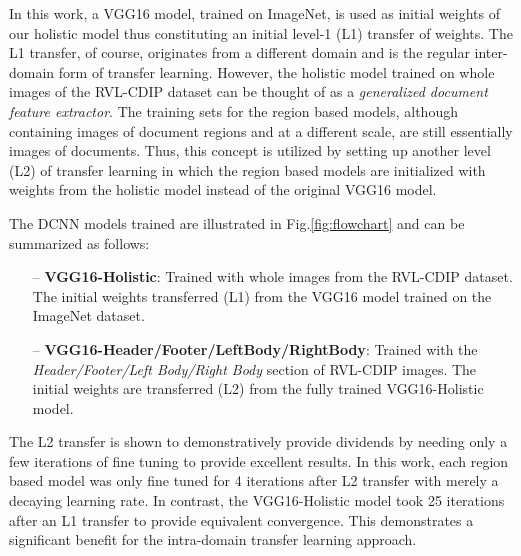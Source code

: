 \documentclass[10pt,conference,a4paper]{IEEEtran}
\begin{document}
In this work, a VGG16 model, trained on ImageNet, is used as initial weights of our holistic model thus constituting an initial level-1 (L1) transfer of weights. The L1 transfer, of course, originates from a different domain and is the regular inter-domain form of transfer learning. However, the holistic model trained on whole images of the RVL-CDIP dataset can be thought of as a \textit{generalized document feature extractor}. The training sets for the region based models, although containing images of document regions and at a different scale, are still essentially images of documents. Thus, this concept is utilized by setting up another level (L2) of transfer learning in which the region based models are initialized with weights from the holistic model instead of the original VGG16 model.

The DCNN models trained are illustrated in Fig.\ref{fig:flowchart} and can be summarized as follows:

\begin{itemize}
\item[--] \textbf{VGG16-Holistic}: Trained with whole images from the RVL-CDIP dataset. The initial weights transferred (L1) from the VGG16 model trained on the ImageNet dataset.
 	
\item[--] \textbf{VGG16-Header/Footer/LeftBody/RightBody}: Trained with the \textit{Header/Footer/Left Body/Right Body} section of RVL-CDIP images. The initial weights are transferred (L2) from the fully trained VGG16-Holistic model.
\end{itemize}

The L2 transfer is shown to demonstratively provide dividends by needing only a few iterations of fine tuning to provide excellent results. In this work, each region based model was only fine tuned for 4 iterations after L2 transfer with merely a decaying learning rate. In contrast, the VGG16-Holistic model took 25 iterations after an L1 transfer to provide equivalent convergence. This demonstrates a significant benefit for the intra-domain transfer learning approach.
\end{document}
